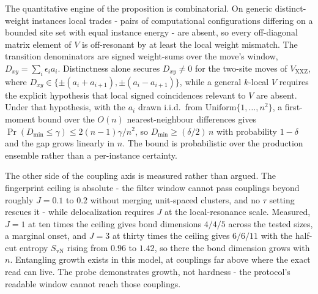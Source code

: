 The quantitative engine of the proposition is combinatorial. On generic distinct-weight instances local trades - pairs of computational configurations differing on a bounded site set with equal instance energy - are absent, so every off-diagonal matrix element of $V$ is off-resonant by at least the local weight mismatch. The transition denominators are signed weight-sums over the move's window, $D_{xy} = \sum_{i} \epsilon_{i} a_{i}$. Distinctness alone secures $D_{xy} \neq 0$ for the two-site moves of $V_{\mathrm{XXZ}}$, where $D_{xy} \in \{\pm(a_{i} + a_{i+1}), \pm(a_{i} - a_{i+1})\}$, while a general $k$-local $V$ requires the explicit hypothesis that local signed coincidences relevant to $V$ are absent. Under that hypothesis, with the $a_{i}$ drawn i.i.d.\ from $\mathrm{Uniform}\{1, \dots, n^{2}\}$, a first-moment bound over the $O(n)$ nearest-neighbour differences gives $\Pr(D_{\min} \le \gamma) \le 2(n-1)\gamma/n^{2}$, so $D_{\min} \ge (\delta/2)\,n$ with probability $1 - \delta$ and the gap grows linearly in $n$. The bound is probabilistic over the production ensemble rather than a per-instance certainty.

The other side of the coupling axis is measured rather than argued. The fingerprint ceiling is absolute - the filter window cannot pass couplings beyond roughly $J = 0.1$ to $0.2$ without merging unit-spaced clusters, and no $\tau$ setting rescues it - while delocalization requires $J$ at the local-resonance scale. Measured, $J = 1$ at ten times the ceiling gives bond dimensions $4/4/5$ across the tested sizes, a marginal onset, and $J = 3$ at thirty times the ceiling gives $6/6/11$ with the half-cut entropy $S_{\mathrm{vN}}$ rising from $0.96$ to $1.42$, so there the bond dimension grows with $n$. Entangling growth exists in this model, at couplings far above where the exact read can live. The probe demonstrates growth, not hardness - the protocol's readable window cannot reach those couplings.

